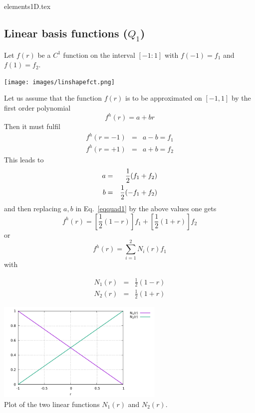 \begin{flushright} {\tiny {\color{gray} elements1D.tex}} \end{flushright}


\subsection{Linear basis functions ($Q_1$) \label{sec:bf1}}

Let $f(r)$ be a $C^1$ function on the interval $[-1:1]$ with $f(-1)=f_1$  and $f(1)=f_2$.
\begin{center}
\texttt{[image: images/linshapefct.png]}
\end{center}
Let us assume that the function $f(r)$ is to be approximated on $[-1,1]$ by the first order polynomial 
\begin{equation}
f^h(r)=a+br \label{eqquad1}
\end{equation}
Then it must fulfil
\begin{eqnarray}
f^h(r=-1)&=&a-b =f_1 \nonumber\\
f^h(r=+1)&=&a+b =f_2 \nonumber
\end{eqnarray}
This leads to  
\begin{eqnarray}
a&=&\frac{1}{2}(f_1+f_2)  \nonumber\\
b&=&\frac{1}{2}(-f_1+f_2)  
\end{eqnarray}
and then replacing $a,b$ in Eq.~\eqref{eqquad1} by the above values one gets
\[
f^h(r) = \left[  \frac{1}{2}(1-r)\right] f_1 + \left[ \frac{1}{2}(1+r) \right] f_2
\]
or
\[
f^h(r)=\sum_{i=1}^2 N_i(r) f_1
\]
with
\begin{mdframed}[backgroundcolor=blue!5]
\begin{eqnarray}
N_1(r) &=& \frac{1}{2} (1-r) \nonumber\\
N_2(r) &=& \frac{1}{2} (1+r)
\end{eqnarray}
\end{mdframed}

\begin{center}
\includegraphics[width=8cm]{images/basis1D/linear.pdf}\\
{\captionfont Plot of the two linear functions $N_1(r)$ and $N_2(r)$.}
\end{center}

